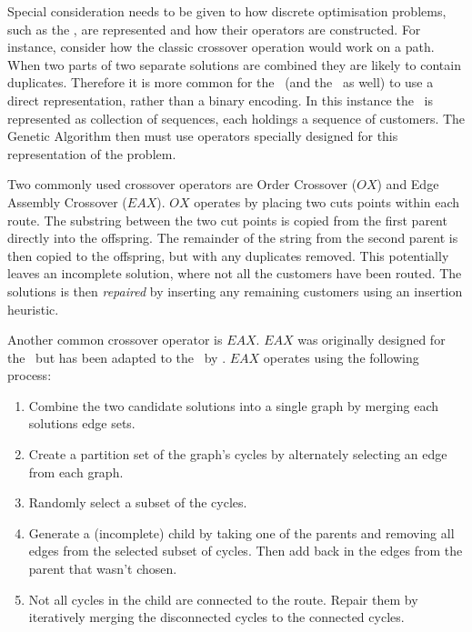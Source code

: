 Special consideration needs to be given to how discrete optimisation problems, such as the \VRP, are represented and how their operators are constructed. For instance, consider how the classic crossover operation would work on a \TSP path. When two parts of two separate solutions are combined they are likely to contain duplicates. Therefore it is more common for the \VRP\ (and the \TSP\ as well) to use a direct representation, rather than a binary encoding. In this instance the \VRP\ is represented as collection of sequences, each holdings a sequence of customers. The Genetic Algorithm then must use operators specially designed for this representation of the problem. 

Two commonly used crossover operators are Order Crossover ($OX$) and Edge Assembly Crossover ($EAX$). $OX$ \cite{OSH:1987} operates by placing two cuts points within each route. The substring between the two cut points is copied from the first parent directly into the offspring. The remainder of the string from the second parent is then copied to the offspring, but with any duplicates removed. This potentially leaves an incomplete solution, where not all the customers have been routed. The solutions is then \emph{repaired} by inserting any remaining customers using an insertion heuristic.


Another common crossover operator is $EAX$. $EAX$ was originally designed for the \TSP\ but has been adapted to the \VRP\ by \cite{Nagata:2007}. $EAX$ operates using the following process:

\begin{enumerate}
    \item Combine the two candidate solutions into a single graph by merging each solutions edge sets.
    \item Create a partition set of the graph's cycles by alternately selecting an edge from each graph.
    \item Randomly select a subset of the cycles.
    \item Generate a (incomplete) child by taking one of the parents and removing all edges from the selected subset of cycles. Then add back in the edges from the parent that wasn't chosen. 
    \item Not all cycles in the child are connected to the route. Repair them by iteratively merging the disconnected cycles to the connected cycles.
\end{enumerate}

